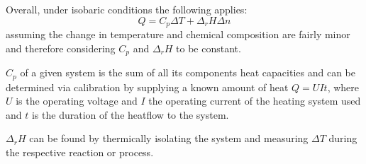Overall, under isobaric conditions the following applies: 
\begin{equation} \label{eq:6} %
    Q = C_p \Delta T + \Delta _rH \Delta n
\end{equation}
assuming the change in temperature and chemical composition are fairly minor and therefore considering $C_p$ and $\Delta _rH$ to be constant. 

$C_p$ of a given system is the sum of all its components heat capacities and can be determined via calibration by supplying a known amount of heat $Q = UIt$, where $U$ is the operating voltage and $I$ the operating current of the heating system used and $t$ is the duration of the heatflow to the system. 

$\Delta _rH$ can be found by thermically isolating the system and measuring $\Delta T$ during the respective reaction or process.


\newpage


